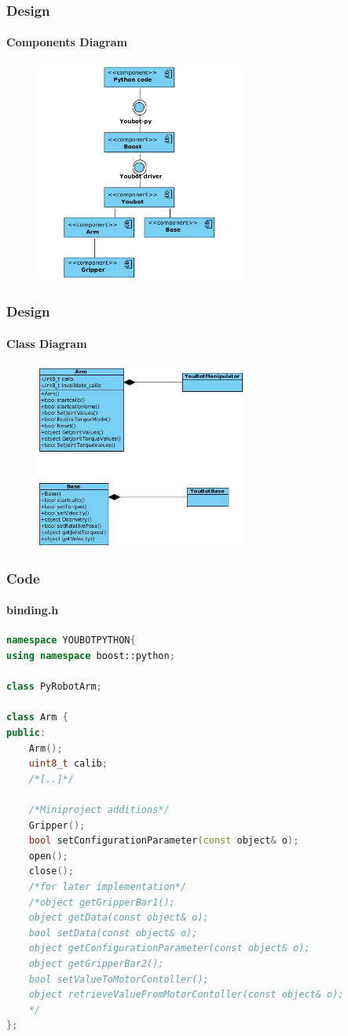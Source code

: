 \documentclass{beamer}
\begin{document}
\begin{frame}
 \frametitle{Design}
 \framesubtitle{Components Diagram}
  \begin{figure}[ht!]
  \centering
  \includegraphics[width=70mm]{img/components.png}
  \caption{}
  \label{Component Diagram}
  \end{figure} 
\end{frame}


\begin{frame}
 \frametitle{Design}
 \framesubtitle{Class Diagram}
  \begin{figure}[ht!]
  \centering
  \includegraphics[width=70mm]{img/classdiagramm.png}
  \caption{}
  \label{Class Diagram}
  \end{figure}
 
\end{frame}


\begin{frame}[fragile]
 \frametitle{Code}
 \framesubtitle{binding.h}
\begin{lstlisting}[language=C++]
namespace YOUBOTPYTHON{
using namespace boost::python;

class PyRobotArm;

class Arm {
public:
    Arm();
    uint8_t calib;
    /*[..]*/

    /*Miniproject additions*/
    Gripper();
    bool setConfigurationParameter(const object& o);
    open();
    close();
    /*for later implementation*/
    /*object getGripperBar1();
    object getData(const object& o);
    bool setData(const object& o);
    object getConfigurationParameter(const object& o);	
    object getGripperBar2();
    bool setValueToMotorContoller();
    object retrieveValueFromMotorContoller(const object& o);
    */
};
\end{lstlisting} 
\end{frame}
\end{document}

